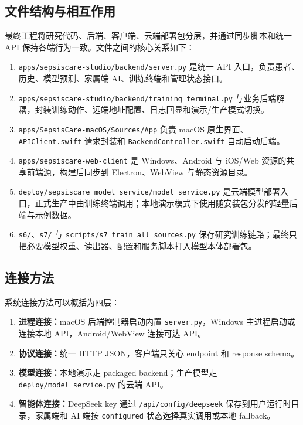 \documentclass[11pt,a4paper]{article}
\begin{document}
\subsection{文件结构与相互作用}
最终工程将研究代码、后端、客户端、云端部署包分层，并通过同步脚本和统一 API 保持各端行为一致。文件之间的核心关系如下：
\begin{enumerate}[leftmargin=*,itemsep=1pt]
  \item \texttt{apps/sepsiscare-studio/backend/server.py} 是统一 API 入口，负责患者、历史、模型预测、家属端 AI、训练终端和管理状态接口。
  \item \texttt{apps/sepsiscare-studio/backend/training\_terminal.py} 与业务后端解耦，封装训练动作、远端地址配置、日志回显和演示/生产模式切换。
  \item \texttt{apps/SepsisCare-macOS/Sources/App} 负责 macOS 原生界面、\texttt{APIClient.swift} 请求封装和 \texttt{BackendController.swift} 自动启动后端。
  \item \texttt{apps/sepsiscare-web-client} 是 Windows、Android 与 iOS/Web 资源的共享前端源，构建后同步到 Electron、WebView 与静态资源目录。
  \item \texttt{deploy/sepsiscare\_model\_service/model\_service.py} 是云端模型部署入口，正式生产中由训练终端调用；本地演示模式下使用随安装包分发的轻量后端与示例数据。
  \item \texttt{s6/}、\texttt{s7/} 与 \texttt{scripts/s7\_train\_all\_sources.py} 保存研究训练链路；最终只把必要模型权重、读出器、配置和服务脚本打入模型本体部署包。
\end{enumerate}

\subsection{连接方法}
系统连接方法可以概括为四层：
\begin{enumerate}[leftmargin=*,itemsep=1pt]
  \item \textbf{进程连接：}macOS 后端控制器启动内置 \texttt{server.py}，Windows 主进程启动或连接本地 API，Android/WebView 连接可达 API。
  \item \textbf{协议连接：}统一 HTTP JSON，客户端只关心 endpoint 和 response schema。
  \item \textbf{模型连接：}本地演示走 packaged backend；生产模型走 \texttt{deploy/model\_service.py} 的云端 API。
  \item \textbf{智能体连接：}DeepSeek key 通过 \texttt{/api/config/deepseek} 保存到用户运行时目录，家属端和 AI 端按 \texttt{configured} 状态选择真实调用或本地 fallback。
\end{enumerate}
\end{document}
